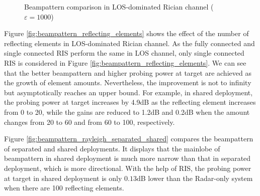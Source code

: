 \begin{figure}[ht]
    \centering

    \caption{Beampattern comparison in LOS-dominated  Rician channel ($\varepsilon = 1000$)}
    \label{fig:beampattern_los_single_fully}
\end{figure}



Figure \ref{fig:beampattern_reflecting_elements} shows the effect of the number of reflecting elements in LOS-dominated  Rician channel. As the fully connected and 
single connected RIS perform the same in LOS channel, only single connected RIS is considered in Figure \ref{fig:beampattern_reflecting_elements}. We can see that 
the better beampattern and higher probing power at target are achieved as the growth of element amounts. Nevertheless, the improvement
is not to infinity but asymptotically reaches an upper bound. For example, in shared deployment, the probing power at target increases by
4.9dB as the reflecting element increases from 0 to 20, while the gains are reduced to 1.2dB and 0.2dB when the amount changes from 20 to 60 and from 60 to 100,
respectively.

Figure \ref{fig:beampattern_rayleigh_separated_shared} compares the beampattern of separated and shared deployments. It displays that the mainlobe of beampattern
in shared deployment is much more narrow than that in separated deployment, which is more directional. With the help of RIS,
the probing power at target in shared deployment is only $0.13$dB lower than the Radar-only system when there are 100 reflecting elements.

